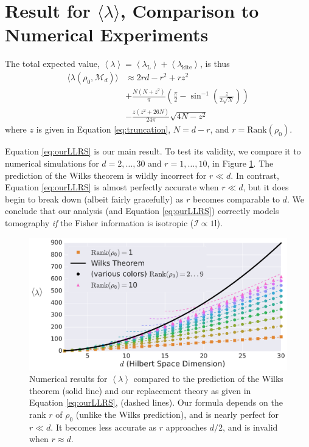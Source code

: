 \documentclass[aps,pra, twocolumn]{revtex4-1}
\newcommand{\M}{\mathcal{M}}
\newcommand{\Id}{\mathbb{I}}
\newcommand{\expect}[1]{\ensuremath{\left\langle#1\right\rangle}}
\def\Id{1\!\mathrm{l}}
\newcommand{\Fi}{\mathcal{I}}
\begin{document}
\section{Result for $\langle \lambda \rangle$, Comparison to Numerical Experiments}
\label{sec:theorycomparison}
The total expected value, $\expect{\lambda} = \expect{\lambda_{\mathrm{L}}} + \expect{\lambda_{\mathrm{kite}}}$, is thus
\begin{align}
\label{eq:ourLLRS}
\nonumber \langle \lambda(\rho_{0}, \M_{d}) \rangle &\approx 2rd - r^{2}+rz^{2}\\
\nonumber & + \frac{N(N+z^{2})}{\pi}\left(\frac{\pi}{2} - \sin^{-1}\left(\frac{z}{2\sqrt{N}}\right)\right) \\
& - \frac{z(z^{2}+26N)}{24\pi}\sqrt{4N-z^{2}}
\end{align}
where $z$ is given in Equation \eqref{eq:truncation}, $N=d-r$, and $r = \mathrm{Rank}(\rho_{0})$.

Equation \eqref{eq:ourLLRS} is our main result.  To test its validity, we compare it to numerical simulations for $d=2,\ldots,30$ and $r=1,\ldots,10$, in Figure \ref{fig:modelcomp-iso}.  The prediction of the Wilks theorem is wildly incorrect for $r\ll d$. In contrast, Equation \eqref{eq:ourLLRS} is almost perfectly accurate when $r \ll d$, but it does begin to break down (albeit fairly gracefully) as $r$ becomes comparable to $d$.  We conclude that our analysis (and Equation \eqref{eq:ourLLRS}) correctly models tomography \emph{if} the Fisher information is isotropic ($\Fi \propto \Id$).

\begin{figure}[h]
 \includegraphics[width=\columnwidth]{Images/Figure_6.pdf}
 \caption{Numerical results for $\expect{\lambda}$ compared to the prediction of the Wilks theorem (solid line) and our replacement theory as given in Equation \eqref{eq:ourLLRS}, (dashed lines).  Our formula depends on the rank $r$ of $\rho_0$ (unlike the Wilks prediction), and is nearly perfect for $r\ll d$.  It becomes less accurate as $r$ approaches $d/2$, and is invalid when $r\approx d$.}
 \label{fig:modelcomp-iso}
\end{figure}
\end{document}
